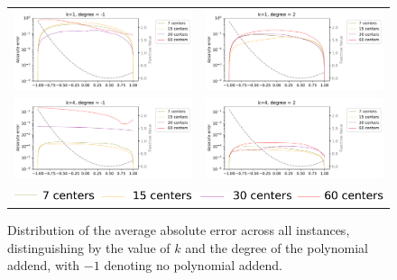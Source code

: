 \documentclass[12pt]{report} %
\begin{document}
\begin{figure}
  \hspace*{-2.5cm}
  \begin{tabular}{cc}
    {\includegraphics[width=.65\textwidth, clip=true,trim={0 0 3.5cm 0}]{imagenes/experiments/1d/ode/None_60_1_-1.pdf}} & {\includegraphics[width=.65\textwidth, clip=true,trim={0 0 3.5cm 0}]{imagenes/experiments/1d/ode/None_60_1_2.pdf}} \\
    {\includegraphics[width=.65\textwidth, clip=true,trim={0 0 3.5cm 0}]{imagenes/experiments/1d/ode/None_60_4_-1.pdf}} & {\includegraphics[width=.65\textwidth, clip=true,trim={0 0 3.5cm 0}]{imagenes/experiments/1d/ode/None_60_4_2.pdf}}   \\
    \multicolumn{2}{c}{{\includegraphics[width=.8\textwidth]{imagenes/experiments/1d/statistical_1d_full_scheduler_interpolation/legend_avg.pdf}}} 
   \end{tabular}
   \caption{Distribution of the average absolute error across all instances, distinguishing by the value of $k$ and the degree of the polynomial addend, with $-1$ denoting no polynomial addend.}
   \label{ode-1d-results-average-error}
\end{figure}
\end{document}

